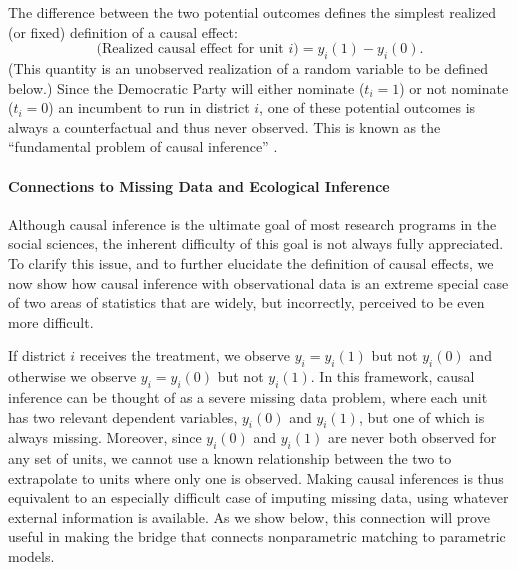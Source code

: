 \documentclass[11pt,titlepage]{article}
\begin{document}
The difference between the two potential outcomes defines the simplest
realized (or fixed) definition of a causal effect:
\begin{equation}
  \label{rce}
  \text{(Realized causal effect for unit $i$)} = y_i(1) - y_i(0).
\end{equation}
(This quantity is an unobserved realization of a random variable to be
defined below.)  Since the Democratic Party will either nominate
($t_i=1$) or not nominate ($t_i=0$) an incumbent to run in district
$i$, one of these potential outcomes is always a counterfactual and
thus never observed. This is known as the ``fundamental problem of
causal inference'' \citep{Holland86}.

\paragraph{Connections to Missing Data and Ecological Inference}
Although causal inference is the ultimate goal of most research
programs in the social sciences, the inherent difficulty of this goal
is not always fully appreciated.  To clarify this issue, and to
further elucidate the definition of causal effects, we now show how
causal inference with observational data is an extreme special case of
two areas of statistics that are widely, but incorrectly, perceived to
be even more difficult.

If district $i$ receives the treatment, we observe $y_i=y_i(1)$ but
not $y_i(0)$ and otherwise we observe $y_i=y_i(0)$ but not $y_i(1)$.
In this framework, causal inference can be thought of as a severe
missing data problem, where each unit has two relevant dependent
variables, $y_i(0)$ and $y_i(1)$, but one of which is always missing.
Moreover, since $y_i(0)$ and $y_i(1)$ are never both observed for any
set of units, we cannot use a known relationship between the two to
extrapolate to units where only one is observed.  Making causal
inferences is thus equivalent to an especially difficult case of
imputing missing data, using whatever external information is
available.  As we show below, this connection will prove useful in
making the bridge that connects nonparametric matching to parametric
models.
\end{document}
